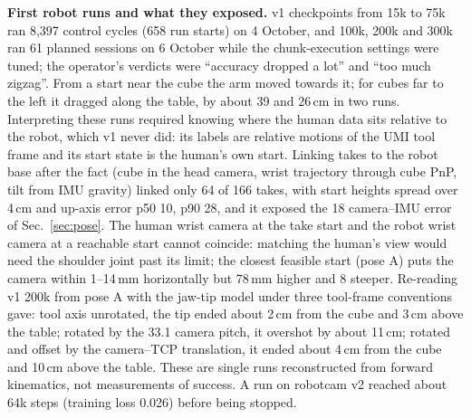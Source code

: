 \documentclass[conference,10pt]{IEEEtran}
\newcommand{\mm}{\,mm\xspace}
\begin{document}
\begin{table}[t]
\centering\footnotesize\setlength{\tabcolsep}{3pt}
\caption{Single-arm held-out loss (masked MSE on the 9 supervised dimensions) by checkpoint; training-subset loss in parentheses.}
\label{tab:val}
\end{table}

\textbf{First robot runs and what they exposed.} v1 checkpoints from 15k to 75k ran 8{,}397 control cycles (658 run starts) on
4 October, and 100k, 200k and 300k ran 61 planned sessions on 6 October while the chunk-execution settings were tuned; the operator's
verdicts were ``accuracy dropped a lot'' and ``too much zigzag''. From a start near the cube the arm moved towards it; for cubes far
to the left it dragged along the table, by about 39 and 26\,cm in two runs. Interpreting these runs required knowing where the human
data sits relative to the robot, which v1 never did: its labels are relative motions of the UMI tool frame and its start state is the
human's own start. Linking takes to the robot base after the fact (cube in the head camera, wrist trajectory through cube PnP, tilt
from IMU gravity) linked only 64 of 166 takes, with start heights spread over 4\,cm and up-axis error p50 10\textdegree, p90
28\textdegree, and it exposed the 18\textdegree{} camera--IMU error of Sec.~\ref{sec:pose}. The human wrist camera at the take start
and the robot wrist camera at a reachable start cannot coincide: matching the human's view would need the shoulder joint past its
limit; the closest feasible start (pose A) puts the camera within 1--14\mm horizontally but 78\mm higher and 8\textdegree{} steeper.
Re-reading v1 200k from pose A with the jaw-tip model under three tool-frame conventions gave: tool axis unrotated, the tip ended
about 2\,cm from the cube and 3\,cm above the table; rotated by the 33.1\textdegree{} camera pitch, it overshot by about 11\,cm;
rotated and offset by the camera--TCP translation, it ended about 4\,cm from the cube and 10\,cm above the table. These are single
runs reconstructed from forward kinematics, not measurements of success. A run on robotcam v2 reached about 64k steps (training
loss 0.026) before being stopped.
\end{document}
